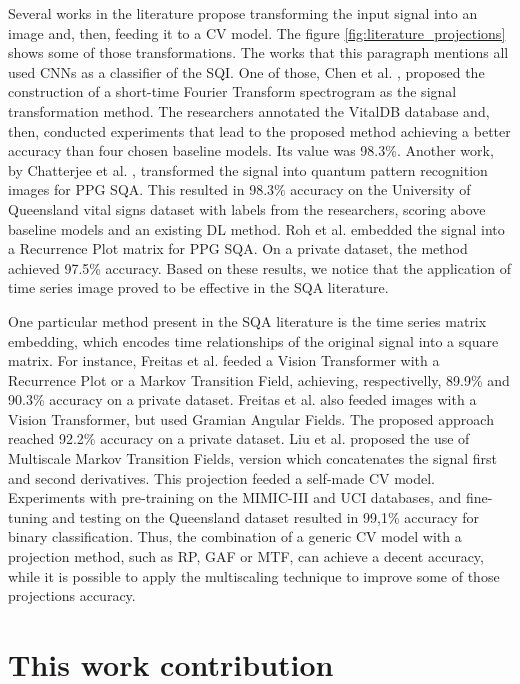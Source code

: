Several works in the literature propose transforming the input signal into an image and, then, feeding it to a \gls{CV} model. The figure \ref{fig:literature_projections} shows some of those transformations. The works that this paragraph mentions all used \gls{CNN}s as a classifier of the \gls{SQI}. One of those, Chen et al. \cite{imaging-1}, proposed the construction of a short-time Fourier Transform spectrogram as the signal transformation method. The researchers annotated the VitalDB database and, then, conducted experiments that lead to the proposed method achieving a better accuracy than four chosen baseline models. Its value was 98.3\%. Another work, by Chatterjee et al. \cite{imaging-2}, transformed the signal into quantum pattern recognition images for PPG \gls{SQA}. This resulted in 98.3\% accuracy on the University of Queensland vital signs dataset with labels from the researchers, scoring above baseline models and an existing \gls{DL} method. Roh et al. \cite{imaging-3} embedded the signal into a Recurrence Plot matrix for PPG \gls{SQA}. On a private dataset, the method achieved 97.5\% accuracy. Based on these results, we notice that the application of time series image proved to be effective in the \gls{SQA} literature.  

One particular method present in the \gls{SQA} literature is the time series matrix embedding, which encodes time relationships of the original signal into a square matrix. For instance, Freitas et al. \cite{imaging-4} feeded a Vision Transformer with a Recurrence Plot or a Markov Transition Field, achieving, respectivelly, 89.9\% and 90.3\% accuracy on a private dataset. Freitas et al. \cite{imaging-5} also feeded images with a Vision Transformer, but used Gramian Angular Fields. The proposed approach reached 92.2\% accuracy on a private dataset. Liu et al. \cite{imaging-6} proposed the use of Multiscale Markov Transition Fields, version which concatenates the signal first and second derivatives. This projection feeded a self-made \gls{CV} model. Experiments with pre-training on the MIMIC-III and UCI databases, and fine-tuning and testing on the Queensland dataset resulted in 99,1\% accuracy for binary classification. Thus, the combination of a generic \gls{CV} model with a projection method, such as \gls{RP}, \gls{GAF} or \gls{MTF}, can achieve a decent accuracy, while it is possible to apply the multiscaling technique to improve some of those projections accuracy. 

\section{This work contribution}
\label{sec:my_work}

